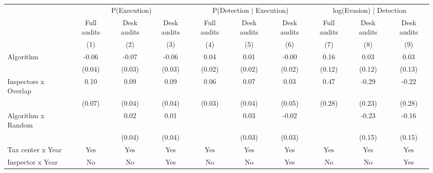 \begin{tabular}{lccc|ccc|ccc} \toprule
\multicolumn{1}{l}{} & \multicolumn{3}{c}{P(Execution)} & \multicolumn{3}{c}{P(Detection | Execution)} & \multicolumn{3}{c}{log(Evasion) | Detection} \\\cmidrule(lr){2-4}\cmidrule(lr){5-7}\cmidrule(lr){8-10} \multicolumn{1}{l}{} & Full audits & Desk audits & Desk audits & Full audits & Desk audits & Desk audits & Full audits & Desk audits & Desk audits \\ \multicolumn{1}{l}{} & (1) & (2) & (3) & (4) & (5) & (6) & (7) & (8) & (9) \\ \midrule
Algorithm   &       -0.06\sym{*}  &       -0.07\sym{***}&       -0.06\sym{**} &        0.04\sym{**} &        0.01         &       -0.00         &        0.16         &        0.03         &        0.03         \\
            &      (0.04)         &      (0.03)         &      (0.03)         &      (0.02)         &      (0.02)         &      (0.02)         &      (0.12)         &      (0.12)         &      (0.13)         \\
\addlinespace
Inspectors x Overlap&        0.10         &        0.09\sym{**} &        0.09\sym{**} &        0.06\sym{*}  &        0.07\sym{*}  &        0.03         &        0.47\sym{*}  &       -0.29         &       -0.22         \\
            &      (0.07)         &      (0.04)         &      (0.04)         &      (0.03)         &      (0.04)         &      (0.05)         &      (0.28)         &      (0.23)         &      (0.28)         \\
\addlinespace
Algorithm x Random&                     &        0.02         &        0.01         &                     &        0.03         &       -0.02         &                     &       -0.23         &       -0.16         \\
            &                     &      (0.04)         &      (0.04)         &                     &      (0.03)         &      (0.03)         &                     &      (0.15)         &      (0.15)         \\
\midrule
Tax center x Year&         Yes         &         Yes         &         Yes         &         Yes         &         Yes         &         Yes         &         Yes         &         Yes         &         Yes         \\
Inspector x Year&          No         &          No         &         Yes         &          No         &          No         &         Yes         &          No         &          No         &         Yes         \\

\end{tabular}
